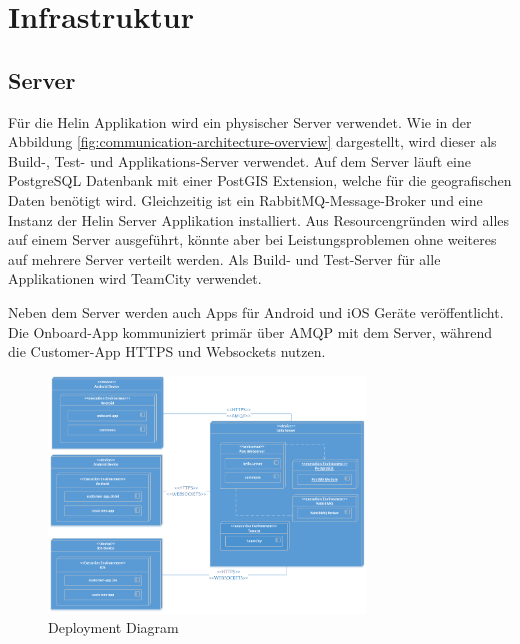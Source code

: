 \newpage

\chapter{Infrastruktur}

\section{Server}

Für die Helin Applikation wird ein physischer Server verwendet. Wie in der Abbildung \ref{fig:communication-architecture-overview} dargestellt, wird dieser als Build-, Test- und Applikations-Server verwendet. 
Auf dem Server läuft eine PostgreSQL Datenbank mit einer PostGIS Extension, welche für die geografischen Daten benötigt wird. Gleichzeitig ist ein RabbitMQ-Message-Broker und eine Instanz der Helin Server Applikation installiert. Aus Resourcengründen wird alles auf einem Server ausgeführt, könnte aber bei Leistungsproblemen ohne weiteres auf mehrere Server verteilt werden. Als Build- und Test-Server für alle Applikationen wird TeamCity verwendet. 

Neben dem Server werden auch Apps für Android und iOS Geräte veröffentlicht. Die Onboard-App kommuniziert primär über AMQP mit dem Server, während die Customer-App HTTPS und Websockets nutzen.

\begin{figure}[h]
	\centering
	\includegraphics[width=0.75\textwidth]{images/DeploymentDiagram.png}
	\caption{Deployment Diagram}
	\label{fig:deployment-diagram}
\end{figure}


